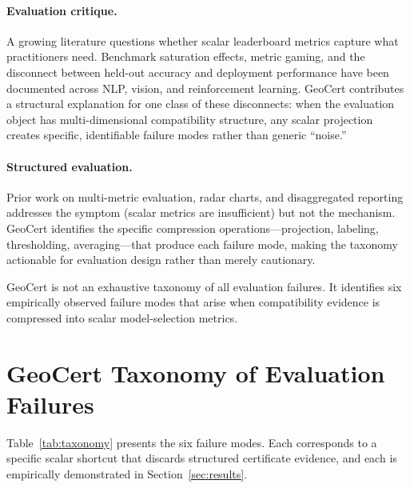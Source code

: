 \documentclass{article}
\begin{document}
\paragraph{Evaluation critique.} A growing literature questions whether scalar leaderboard metrics capture what practitioners need. Benchmark saturation effects, metric gaming, and the disconnect between held-out accuracy and deployment performance have been documented across NLP, vision, and reinforcement learning. GeoCert contributes a structural explanation for one class of these disconnects: when the evaluation object has multi-dimensional compatibility structure, any scalar projection creates specific, identifiable failure modes rather than generic ``noise.''

\paragraph{Structured evaluation.} Prior work on multi-metric evaluation, radar charts, and disaggregated reporting addresses the symptom (scalar metrics are insufficient) but not the mechanism. GeoCert identifies the specific compression operations---projection, labeling, thresholding, averaging---that produce each failure mode, making the taxonomy actionable for evaluation design rather than merely cautionary.

GeoCert is not an exhaustive taxonomy of all evaluation failures. It identifies six empirically observed failure modes that arise when compatibility evidence is compressed into scalar model-selection metrics.

\section{GeoCert Taxonomy of Evaluation Failures}

Table~\ref{tab:taxonomy} presents the six failure modes. Each corresponds to a specific scalar shortcut that discards structured certificate evidence, and each is empirically demonstrated in Section~\ref{sec:results}.
\end{document}
